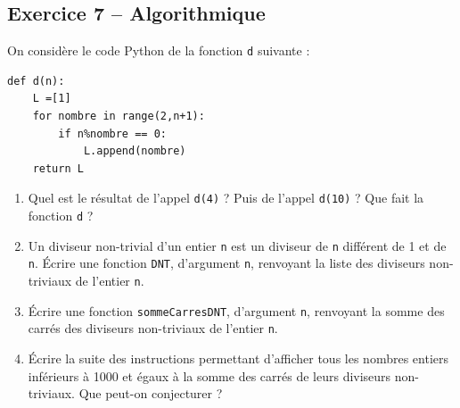 \documentclass[10pt,fleqn]{article} %
\begin{document}
\begin{multicols}{2}
\subsection*{Exercice 7 -- Algorithmique }

On considère le code Python de la fonction \texttt{d} suivante :

\begin{py}
\begin{lstlisting}
def d(n):
    L =[1]
    for nombre in range(2,n+1):
        if n%nombre == 0:
            L.append(nombre)
    return L
\end{lstlisting}
\end{py}

\begin{enumerate}
\item Quel est le résultat de l’appel \texttt{d(4)} ? Puis de l’appel \texttt{d(10)} ?
Que fait la fonction \texttt{d} ?
\item Un diviseur non-trivial d’un entier \texttt{n} est un diviseur de \texttt{n} différent de 1 et de \texttt{n}. Écrire une fonction \texttt{DNT}, d’argument \texttt{n}, renvoyant la liste des diviseurs non-triviaux de l’entier \texttt{n}.
\item Écrire une fonction \texttt{sommeCarresDNT}, d’argument \texttt{n}, renvoyant la somme des carrés des diviseurs non-triviaux de l’entier \texttt{n}.
\item Écrire la suite des instructions permettant d’afficher tous les nombres entiers inférieurs à 1000 et égaux à la somme des carrés de leurs diviseurs non-triviaux. Que peut-on conjecturer ?
\end{enumerate}


\end{multicols}
\end{document}
